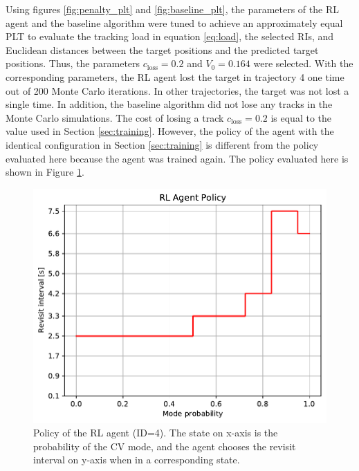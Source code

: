 \documentclass[english, 12pt, a4paper, elec, utf8, a-1b, online]{aaltothesis}
\numberwithin{equation}{section}
\newcommand{\closs}{c_\text{loss}}
\begin{document}
Using figures \ref{fig:penalty_plt} and \ref{fig:baseline_plt}, the parameters of the RL agent and the baseline algorithm were tuned to achieve an approximately equal PLT to evaluate the tracking load in equation \eqref{eq:load}, the selected RIs, and Euclidean distances between the target positions and the predicted target positions.
Thus, the parameters $\closs = 0.2$ and $V_0=0.164$ were selected.
With the corresponding parameters, the RL agent lost the target in trajectory 4 one time out of 200 Monte Carlo iterations. 
In other trajectories, the target was not lost a single time.
In addition, the baseline algorithm did not lose any tracks in the Monte Carlo simulations.
The cost of losing a track $\closs=0.2$ is equal to the value used in Section \ref{sec:training}.
However, the policy of the agent with the identical configuration in Section \ref{sec:training} is different from the policy evaluated here because the agent was trained again.
The policy evaluated here is shown in Figure \ref{fig:policy_id4}.

\begin{figure}[tb]
    \centering
    \includegraphics[width=.8\linewidth]{figures/benchmark/Training/policy.pdf}
    \caption{Policy of the RL agent (ID=4). The state on x-axis is the probability of the CV mode, and the agent chooses the revisit interval on y-axis when in a corresponding state.}
    \label{fig:policy_id4}
\end{figure}
\end{document}
